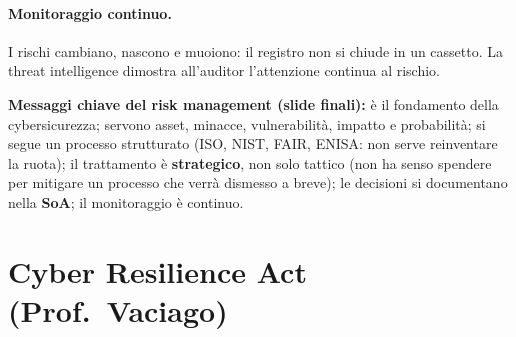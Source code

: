 \paragraph{Monitoraggio continuo.} I rischi cambiano, nascono e muoiono: il registro non si chiude in un
cassetto. La threat intelligence dimostra all'auditor l'attenzione continua al rischio.

\begin{esame}
\textbf{Messaggi chiave del risk management (slide finali):} è il fondamento della cybersicurezza; servono
asset, minacce, vulnerabilità, impatto e probabilità; si segue un processo strutturato (ISO, NIST, FAIR,
ENISA: non serve reinventare la ruota); il trattamento è \textbf{strategico}, non solo tattico (non ha
senso spendere per mitigare un processo che verrà dismesso a breve); le decisioni si documentano nella
\textbf{SoA}; il monitoraggio è continuo.
\end{esame}

\section{Cyber Resilience Act (Prof.~Vaciago)}

